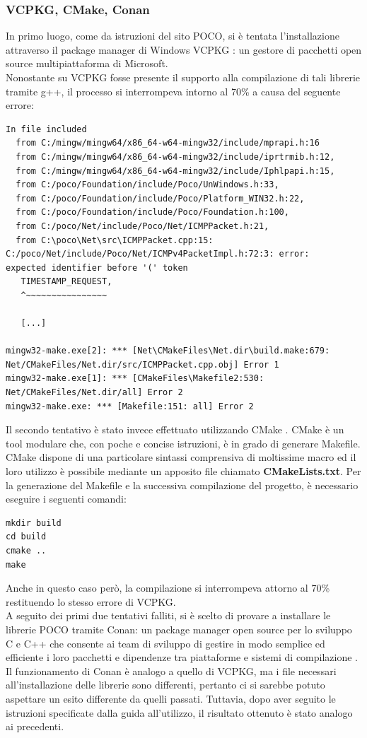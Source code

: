 \subsubsection{VCPKG, CMake, Conan}
In primo luogo, come da istruzioni del sito POCO, si è tentata l’installazione attraverso il package manager di Windows VCPKG \cite{VCPKG}: un gestore di pacchetti open source multipiattaforma di Microsoft. \\
Nonostante su VCPKG fosse presente il supporto alla compilazione di tali librerie tramite g++, il processo si interrompeva intorno al 70\% a causa del seguente errore:\\
\begin{verbatim}
In file included 
  from C:/mingw/mingw64/x86_64-w64-mingw32/include/mprapi.h:16       
  from C:/mingw/mingw64/x86_64-w64-mingw32/include/iprtrmib.h:12,
  from C:/mingw/mingw64/x86_64-w64-mingw32/include/Iphlpapi.h:15,
  from C:/poco/Foundation/include/Poco/UnWindows.h:33,
  from C:/poco/Foundation/include/Poco/Platform_WIN32.h:22,
  from C:/poco/Foundation/include/Poco/Foundation.h:100,
  from C:/poco/Net/include/Poco/Net/ICMPPacket.h:21,
  from C:\poco\Net\src\ICMPPacket.cpp:15:
C:/poco/Net/include/Poco/Net/ICMPv4PacketImpl.h:72:3: error: 
expected identifier before '(' token
   TIMESTAMP_REQUEST,
   ^~~~~~~~~~~~~~~~~
   
   [...]
   
mingw32-make.exe[2]: *** [Net\CMakeFiles\Net.dir\build.make:679:
Net/CMakeFiles/Net.dir/src/ICMPPacket.cpp.obj] Error 1
mingw32-make.exe[1]: *** [CMakeFiles\Makefile2:530: 
Net/CMakeFiles/Net.dir/all] Error 2
mingw32-make.exe: *** [Makefile:151: all] Error 2

\end{verbatim}
Il secondo tentativo è stato invece effettuato utilizzando CMake \cite{CMake}. CMake è un tool modulare che, con poche e concise istruzioni, è in grado di generare Makefile. CMake dispone di una particolare sintassi comprensiva di moltissime macro ed il loro utilizzo è possibile mediante un apposito file chiamato  \textbf{CMakeLists.txt}. Per la generazione del Makefile e la successiva compilazione del progetto, è necessario eseguire i seguenti comandi:
\begin{verbatim}
mkdir build
cd build
cmake ..
make
\end{verbatim}
Anche in questo caso però, la compilazione si interrompeva attorno al 70\% restituendo lo stesso errore di VCPKG.\\
A seguito dei primi due tentativi falliti, si è scelto di provare a installare le librerie POCO tramite Conan: un package manager open source per lo sviluppo C e C++ che consente ai team di sviluppo di gestire in modo semplice ed efficiente i loro pacchetti e dipendenze tra piattaforme e sistemi di compilazione \cite{Conan}. Il funzionamento di Conan è analogo a quello di VCPKG, ma i file necessari all’installazione delle librerie sono differenti, pertanto ci si sarebbe potuto aspettare un esito differente da quelli passati. Tuttavia, dopo aver seguito le istruzioni specificate dalla guida all'utilizzo, il risultato ottenuto è stato analogo ai precedenti.
